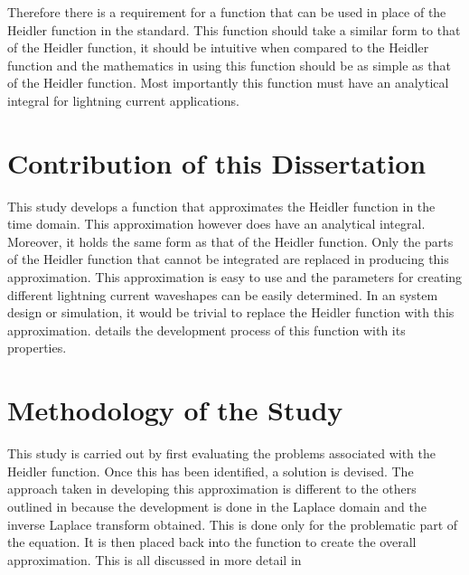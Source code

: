 Therefore there is a requirement for a function that can be used in place of the Heidler function in the standard. This function should take a similar form to that of the Heidler function, it should be intuitive when compared to the Heidler function and the mathematics in using this function should be as simple as that of the Heidler function. Most importantly this function must have an analytical integral for lightning current applications.


\section{Contribution of this Dissertation}
\label{sec:approach_contribution_of_this_dissertation}
This study develops a function that approximates the Heidler function in the time domain. This approximation however does have an analytical integral. Moreover, it holds the same form as that of the Heidler function. Only the parts of the Heidler function that cannot be integrated are replaced in producing this approximation. This approximation is easy to use and the parameters for creating different lightning current waveshapes can be easily determined. In an system design or simulation, it would be trivial to replace the Heidler function with this approximation.  details the development process of this function with its properties.


\section{Methodology of the Study}
\label{sec:approach_study_methodology}
This study is carried out by first evaluating the problems associated with the Heidler function. Once this has been identified, a solution is devised. The approach taken in developing this approximation is different to the others outlined in  because the development is done in the Laplace domain and the inverse Laplace transform obtained. This is done only for the problematic part of the equation. It is then placed back into the function to create the overall approximation. This is all discussed in more detail in 

